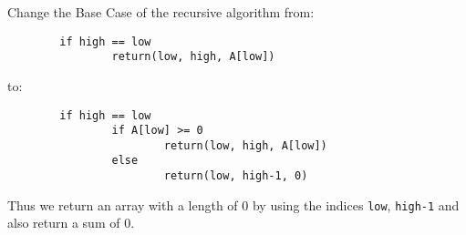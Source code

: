 Change the Base Case of the recursive algorithm from:
\begin{verbatim}
        if high == low
                return(low, high, A[low])
\end{verbatim}
to:
\begin{verbatim}
        if high == low
                if A[low] >= 0
                        return(low, high, A[low])
                else
                        return(low, high-1, 0)
\end{verbatim}
Thus we return an array with a length of $0$ by using the indices \texttt{low}, \texttt{high-1} and also return a sum of $0$.

